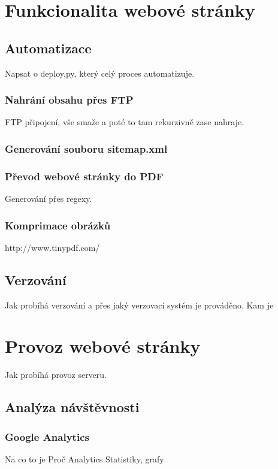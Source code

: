 \documentclass[a4paper, 12pt]{article}
\begin{document}
  \section{Funkcionalita webové stránky}

  \subsection{Automatizace}
  Napsat o deploy.py, který celý proces automatizuje.

  \subsubsection{Nahrání obsahu přes FTP}
  FTP připojení, vše smaže a poté to tam rekurzivně zase nahraje.

  \subsubsection{Generování souboru sitemap.xml}

  \subsubsection{Převod webové stránky do PDF}
  Generování přes regexy.

  \subsubsection{Komprimace obrázků}
  http://www.tinypdf.com/

  \subsection{Verzování}
  Jak probíhá verzování a přes jaký verzovací systém je prováděno.
  Kam je

  \section{Provoz webové stránky}
  Jak probíhá provoz serveru.

  \subsection{Analýza návštěvnosti}

  \subsubsection{Google Analytics}
  Na co to je
  Proč Analytics
  Statistiky, grafy
\end{document}

